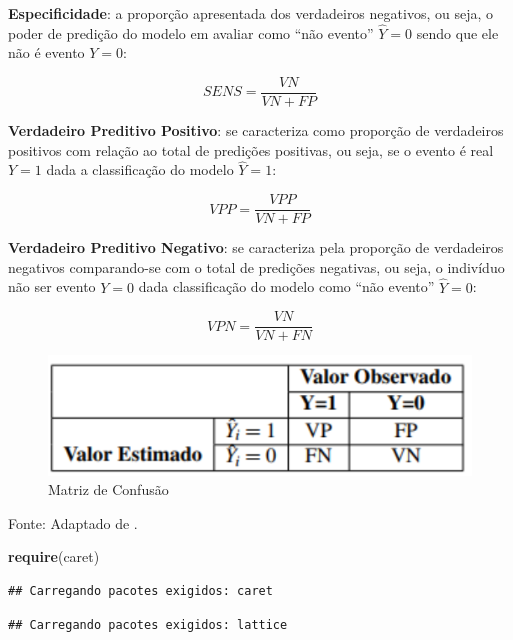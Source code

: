 \documentclass[12pt,brazil,]{book}
\newenvironment{Shaded}{\begin{snugshade}}{\end{snugshade}}
\newcommand{\DataTypeTok}[1]{\textcolor[rgb]{0.13,0.29,0.53}{#1}}
\newcommand{\FloatTok}[1]{\textcolor[rgb]{0.00,0.00,0.81}{#1}}
\newcommand{\KeywordTok}[1]{\textcolor[rgb]{0.13,0.29,0.53}{\textbf{#1}}}
\newcommand{\NormalTok}[1]{#1}
\newcommand{\OperatorTok}[1]{\textcolor[rgb]{0.81,0.36,0.00}{\textbf{#1}}}
\newcommand{\StringTok}[1]{\textcolor[rgb]{0.31,0.60,0.02}{#1}}
\begin{document}
\textbf{Especificidade}: a proporção apresentada dos verdadeiros
negativos, ou seja, o poder de predição do modelo em avaliar como ``não
evento'' \(\hat Y=0\) sendo que ele não é evento \(Y=0\):

\[
SENS=\frac{VN}{VN+FP}
\]

\textbf{Verdadeiro Preditivo Positivo}: se caracteriza como proporção de
verdadeiros positivos com relação ao total de predições positivas, ou
seja, se o evento é real \(Y=1\) dada a classificação do modelo
\(\hat Y=1\):

\[
VPP=\frac{VPP}{VN+FP}
\]

\textbf{Verdadeiro Preditivo Negativo}: se caracteriza pela proporção de
verdadeiros negativos comparando-se com o total de predições negativas,
ou seja, o indivíduo não ser evento \(Y=0\) dada classificação do modelo
como ``não evento'' \(\hat Y=0\):

\[
VPN=\frac{VN}{VN+FN}
\]

\begin{figure}
\centering
\includegraphics{matriz.png}
\caption{Matriz de Confusão}
\end{figure}

Fonte: Adaptado de \textcite{Fawcett2006}.

\begin{Shaded}
\begin{Highlighting}[]
\KeywordTok{require}\NormalTok{(caret)}
\end{Highlighting}
\end{Shaded}

\begin{verbatim}
## Carregando pacotes exigidos: caret
\end{verbatim}

\begin{verbatim}
## Carregando pacotes exigidos: lattice
\end{verbatim}

\begin{Shaded}
\end{Shaded}
\end{document}
